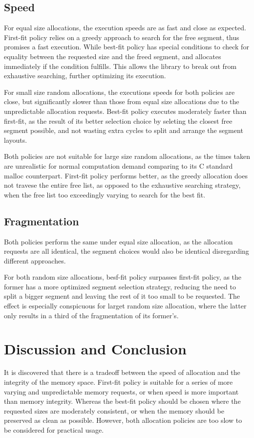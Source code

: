 \documentclass[12pt, letterpaper]{article}
\begin{document}
    \subsection*{Speed}
      For equal size allocations, the execution speeds are as fast and close as expected.
      First-fit policy relies on a greedy approach to search for the free segment,
      thus promises a fast execution. 
      While best-fit policy has special conditions to check for equality between the requested size and the freed segment,
      and allocates immediately if the condition fulfills. 
      This allows the library to break out from exhaustive searching, further optimizing its execution. 

      For small size random allocations, the executions speeds for both policies are close,
      but significantly slower than those from equal size allocations due to the unpredictable allocation requests.
      Best-fit policy executes moderately faster than first-fit, 
      as the result of its better selection choice by seleting the closest free segment possible,
      and not wasting extra cycles to split and arrange the segment layouts.

      Both policies are not suitable for large size random allocations, 
      as the times taken are unrealistic for normal computation demand comparing to its C standard malloc counterpart. 
      First-fit policy performs better, as the greedy allocation does not travese the entire free list,
      as opposed to the exhaustive searching strategy, when the free list too exceedingly varying to search for the best fit. 


    \subsection*{Fragmentation}
      Both policies perform the same under equal size allocation, as the allocation requests are all identical, 
      the segment choices would also be identical disregarding different approaches.

      For both random size allocations, besf-fit policy surpasses first-fit policy, 
      as the former has a more optimized segment selection strategy, 
      reducing the need to split a bigger segment and leaving the rest of it too small to be requested. 
      The effect is especially conspicuous for larget random size allocation, 
      where the latter only results in a third of the fragmentation of its former's. 

  \section*{Discussion and Conclusion}
    It is discovered that there is a tradeoff between the speed of allocation and the integrity of the memory space.
    First-fit policy is suitable for a series of more varying and unpredictable memory requests,
    or when speed is more important than memory integrity. 
    Whereas the best-fit policy should be chosen where the requested sizes are moderately consistent,
    or when the memory should be preserved as clean as possible. 
    However, both allocation policies are too slow to be considered for practical usage. 
\end{document}
